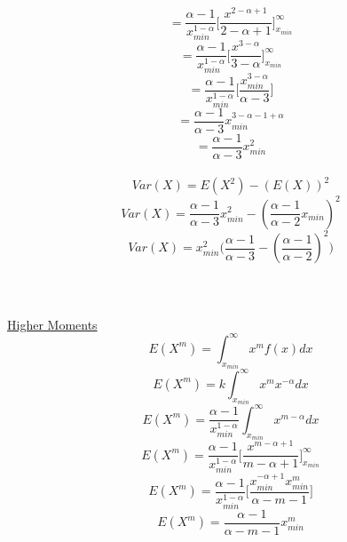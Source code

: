 \documentclass[14pt, a4paper]{article}
\theoremstyle{definition}
\begin{document}
\[  =  \frac{\alpha - 1 }{x_{min}^{1-\alpha}} \Big[ \frac{x^{2 -\alpha+1}}{2- \alpha +1} \Big]^\infty_{x_{min}} \]
\[  =  \frac{\alpha - 1 }{x_{min}^{1-\alpha}} \Big[ \frac{x^{3 -\alpha}}{3 - \alpha } \Big]^\infty_{x_{min}} \]
\[  =  \frac{\alpha - 1 }{x_{min}^{1-\alpha}} \Big[ \frac{x_{min}^{3 -\alpha}}{\alpha - 3 } \Big] \]
\[  =  \frac{\alpha - 1 }{\alpha - 3} x_{min}^{3 -\alpha - 1+ \alpha}\]
\[ = \frac{\alpha - 1 }{\alpha - 3} x_{min}^2\]
\\
\[ Var(X) = E(X^2) - (E(X))^2\]
\[ Var(X) = \frac{\alpha - 1 }{\alpha - 3} x_{min}^2 - (\frac{\alpha - 1}{\alpha - 2} x_{min})^2\]
\[ Var(X) = x_{min}^2 \Big( \frac{\alpha -1}{\alpha - 3} - (\frac{\alpha - 1}{\alpha - 2}) ^2\Big)\]
\\ 
\\ 
\\ \underline{Higher Moments}
\[ E(X^m) = \int^\infty_{x_{min}} x^m f(x) dx \] 
\[ E(X^m) = k \int^\infty_{x_{min}} x^m x^{-\alpha} dx\]
\[ E(X^m) = \frac{\alpha - 1}{x_{min}^{1 -\alpha}} \int^\infty_{x_{min}} x^{m-\alpha} dx\]
\[ E(X^m) = \frac{\alpha - 1}{x_{min}^{1 -\alpha}} \Big[ \frac{x^{m-\alpha + 1}}{m- \alpha +1} \Big]^\infty _{x_{min}} \]
\[ E(X^m) = \frac{\alpha - 1}{x_{min}^{1 -\alpha}} \Big[ \frac{x_{min}^{-\alpha + 1} x_{min}^m}{\alpha -m  -1} \Big] \]
\[ E(X^m) = \frac{\alpha - 1}{\alpha - m - 1} x_{min}^m\]
\end{document}

